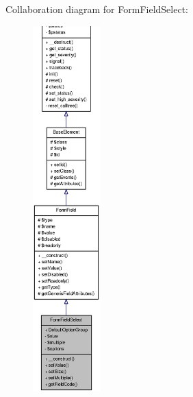 Collaboration diagram for FormFieldSelect:\nopagebreak
\begin{figure}[H]
\begin{center}
\leavevmode
\includegraphics[height=400pt]{classFormFieldSelect__coll__graph}
\end{center}
\end{figure}
